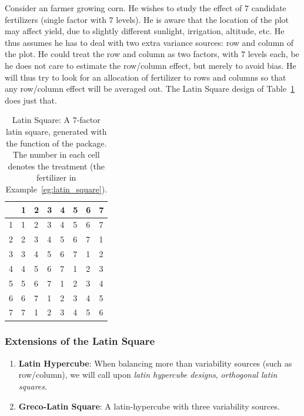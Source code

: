 \begin{example}
\label{eg:latin_square}
Consider an farmer growing corn.
He wishes to study the effect of $7$ candidate fertilizers (single factor with $7$ levels).
He is aware that the location of the plot may affect yield, due to slightly different sunlight, irrigation, altitude, etc.
He thus assumes he has to deal with two extra variance sources: row and column of the plot. 
He could treat the row and column as two factors, with $7$ levels each, be he does not care to estimate the row/column effect, but merely to avoid bias.
He will thus try to look for an allocation of fertilizer to rows and columns so that any row/column effect will be averaged out.
The Latin Square design of Table~\ref{tab:latin_square} does just that.
\end{example}
\begin{table}[ht]
\centering
\begin{tabular}{rlllllll}
  \hline
 & 1 & 2 & 3 & 4 & 5 & 6 & 7 \\ 
  \hline
1 & 1 & 2 & 3 & 4 & 5 & 6 & 7 \\ 
  2 & 2 & 3 & 4 & 5 & 6 & 7 & 1 \\ 
  3 & 3 & 4 & 5 & 6 & 7 & 1 & 2 \\ 
  4 & 4 & 5 & 6 & 7 & 1 & 2 & 3 \\ 
  5 & 5 & 6 & 7 & 1 & 2 & 3 & 4 \\ 
  6 & 6 & 7 & 1 & 2 & 3 & 4 & 5 \\ 
  7 & 7 & 1 & 2 & 3 & 4 & 5 & 6 \\ 
   \hline
\end{tabular}
\label{tab:latin_square}
\caption[Latin Square]{Latin Square: A $7$-factor latin square, generated with the  function of the  \R package.
The number in each cell denotes the treatment (the fertilizer in Example~\ref{eg:latin_square}).}
\end{table}

\subsubsection{Extensions of the Latin Square}
\begin{enumerate}
\item \textbf{Latin Hypercube}: When balancing more than variability sources (such as row/column), we will call upon \emph{latin hypercube designs}, \aka \emph{orthogonal latin squares}. 
\item \textbf{Greco-Latin Square}: A latin-hypercube with three variability sources. 
\end{enumerate}





